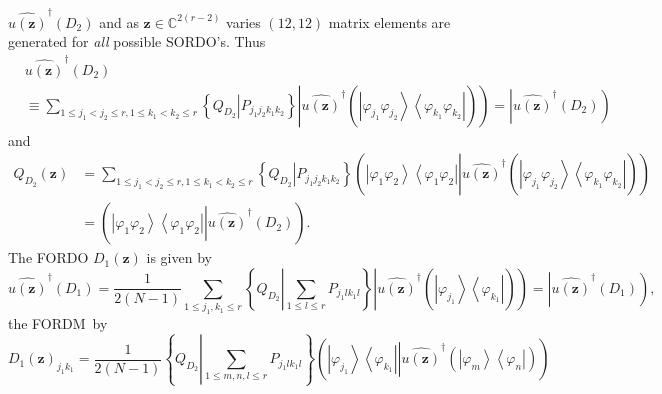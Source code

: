 \documentclass[aps,preprint]{revtex4}%
\begin{document}
$\widehat{u\left(  \mathbf{z}\right)  }^{\dagger}\left(  D_{2}\right)  $ and
as $\mathbf{z\in}\mathbb{C}^{2\left(  r-2\right)  }$ varies $\left(
12,12\right)  $ matrix elements are generated for \emph{all }possible
SORDO's.  Thus
\begin{align}
&  \widehat{u\left(  \mathbf{z}\right)  }^{\dagger}\left(  D_{2}\right)
\nonumber\\
&  \equiv\sum_{1\leq j_{1}<j_{2}\leq r,1\leq k_{1}<k_{2}\leq r}\left\{
\left.  \overset{}{Q_{D_{2}}}\right\vert \overset{}{P_{j_{1}j_{2}k_{1}k_{2}}%
}\right\}  \left\vert \widehat{u\left(  \mathbf{z}\right)  }^{\dagger}\left(
\overset{}{\left\vert \varphi_{j_{1}}\varphi_{j_{2}}\right\rangle \left\langle
\varphi_{k_{1}}\varphi_{k_{2}}\right\vert }\right)  \right)  =\left\vert
\widehat{u\left(  \mathbf{z}\right)  }^{\dagger}\left(  D_{2}\right)  \right)
\end{align}
and
\begin{align}
Q_{D_{2}}\left(  \mathbf{z}\right)   &  =\sum_{1\leq j_{1}<j_{2}\leq r,1\leq
k_{1}<k_{2}\leq r}\left\{  \left.  \overset{}{Q_{D_{2}}}\right\vert
\overset{}{P_{j_{1}j_{2}k_{1}k_{2}}}\right\}  \left(  \left\vert \varphi
_{1}\varphi_{2}\right\rangle \left\langle \varphi_{1}\varphi_{2}\right\vert
\left\vert \widehat{u\left(  \mathbf{z}\right)  }^{\dagger}\left(
\overset{}{\left\vert \varphi_{j_{1}}\varphi_{j_{2}}\right\rangle \left\langle
\varphi_{k_{1}}\varphi_{k_{2}}\right\vert }\right)  \right.  \right)
\nonumber\\
&  =\left(  \left\vert \varphi_{1}\varphi_{2}\right\rangle \left\langle
\varphi_{1}\varphi_{2}\right\vert \left\vert \widehat{u\left(  \mathbf{z}%
\right)  }^{\dagger}\left(  D_{2}\right)  \right.  \right)  .
\end{align}
The FORDO $D_{1}\left(  \mathbf{z}\right)  $ is given by
\begin{equation}
\widehat{u\left(  \mathbf{z}\right)  }^{\dagger}\left(  D_{1}\right)
=\frac{1}{2\left(  N-1\right)  }\sum_{1\leq j_{1},k_{1}\leq r}\left\{
Q_{D_{2}}\left\vert \sum_{1\leq l\leq r}P_{j_{1}lk_{1}l}\right.  \right\}
\left\vert \widehat{u\left(  \mathbf{z}\right)  }^{\dagger}\left(
\overset{}{\left\vert \varphi_{j_{1}}\right\rangle \left\langle \varphi
_{k_{1}}\right\vert }\right)  \right)  =\left\vert \widehat{u\left(
\mathbf{z}\right)  }^{\dagger}\left(  D_{1}\right)  \right)  ,
\end{equation}
the FORDM\ by
\begin{equation}
D_{1}\left(  \mathbf{z}\right)  _{j_{1}k_{1}}=\frac{1}{2\left(  N-1\right)
}\left\{  Q_{D_{2}}\left\vert \sum_{1\leq m,n,l\leq r}P_{j_{1}lk_{1}l}\right.
\right\}  \left(  \left\vert \varphi_{j_{1}}\right\rangle \left\langle
\varphi_{k_{1}}\right\vert \left\vert \widehat{u\left(  \mathbf{z}\right)
}^{\dagger}\left(  \overset{}{\left\vert \varphi_{m}\right\rangle \left\langle
\varphi_{n}\right\vert }\right)  \right.  \right)
\end{equation}
\end{document}
